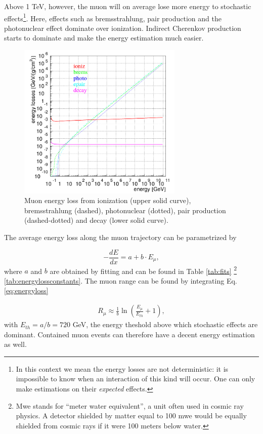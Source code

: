 Above 1 TeV, however, the muon will on average lose more energy to stochastic effects\footnote{In this context we mean the energy losses are not deterministic: it is impossible to know when an interaction of this kind will occur. One can only make estimations on their \textit{expected} effects.}. Here, effects such as bremsstrahlung, pair production and the photonuclear effect dominate over ionization. Indirect Cherenkov production starts to dominate and make the energy estimation much easier.\\
\newline
\begin{figure}[t]
\centering
\includegraphics[width = 0.7\textwidth]{chapter4/img/muonenergyloss.png}
\caption{Muon energy loss from ionization (upper solid curve), bremsstrahlung (dashed), photonuclear (dotted), pair production (dashed-dotted) and decay (lower solid curve).}
\label{fig:energyloss}
\end{figure}
The average energy loss along the muon trajectory can be parametrized by 

\begin{equation}
\label{eq:energyloss}
- \frac{dE}{dx} = a + b \cdot E_\mu,
\end{equation}
where $a$ and $b$ are obtained by fitting and can be found in Table \ref{tab:fits} \footnote{Mwe stands for ``meter water equivalent'', a unit often used in cosmic ray physics. A detector shielded by matter equal to 100 mwe would be equally shielded from cosmic rays if it were 100 meters below water.} \ref{tab:energylossconstants}. The muon range can be found by integrating Eq. \ref{eq:energyloss}

\begin{equation}
\begin{split}
R_\mu \approx \frac{1}{b} \ln \left( \frac{E_\mu}{E_{th}} +1 \right),
\end{split}
\end{equation}
with $E_{th} = a/b = 720$ GeV, the energy theshold above which stochastic effects are dominant. Contained muon events can therefore have a decent energy estimation as well.


